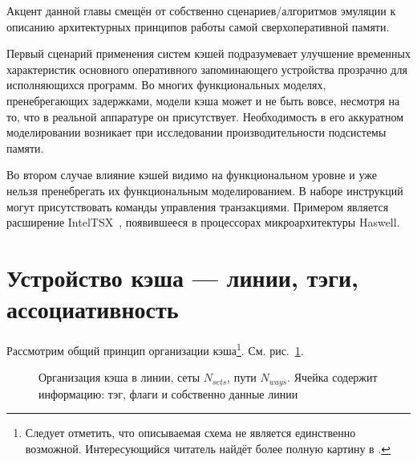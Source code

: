 \begin{digression}

Акцент данной главы смещён от собственно сценариев/алгоритмов эмуляции к описанию архитектурных принципов работы самой сверхоперативной памяти. 

Первый сценарий применения систем кэшей подразумевает улучшение временных характеристик основного оперативного запоминающего устройства прозрачно для исполняющихся программ. Во многих функциональных моделях, пренебрегающих задержками, модели кэша может и не быть вовсе, несмотря на то, что в реальной аппаратуре он присутствует. Необходимость в его аккуратном моделировании возникает при  исследовании производительности подсистемы памяти.

Во втором случае влияние кэшей видимо на функциональном уровне и уже нельзя пренебрегать их функциональным моделированием. В наборе инструкций могут присутствовать команды управления транзакциями. Примером является расширение Intel\textregistered TSX~\cite[глава 8]{intel-x-reference}, появившееся в процессорах микроархитектуры Haswell.

\end{digression}


\section{Устройство кэша --- линии, тэги, ассоциативность}

Рассмотрим общий принцип организации кэша\footnote{Следует отметить, что описываемая схема не является единственно возможной. Интересующийся читатель найдёт более полную картину в \cite{hennessy-patterson}.}. См. рис.~\ref{fig:cache}.

\begin{figure}[htb]
    \centering
    \caption[Организация кэша в линии, сеты, пути]{Организация кэша в линии, сеты $N_{sets}$, пути $N_{ways}$. Ячейка содержит информацию: тэг, флаги и собственно данные линии}
    \label{fig:cache}
\end{figure}



